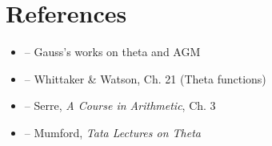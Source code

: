 \section{References}

\begin{itemize}
    \item \cite{gauss-works} -- Gauss's works on theta and AGM
    \item \cite{whittaker-watson} -- Whittaker \& Watson, Ch. 21 (Theta functions)
    \item \cite{serre-modular} -- Serre, \textit{A Course in Arithmetic}, Ch. 3
    \item \cite{mumford-tata} -- Mumford, \textit{Tata Lectures on Theta}
\end{itemize}
